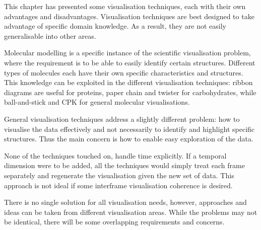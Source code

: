 This chapter has presented some visualisation techniques, each with their own
advantages and disadvantages. Visualisation techniques are best designed to
take advantage of specific domain knowledge. As a result, they are not easily
generalisable into other areas.

Molecular modelling is a specific instance of the scientific visualisation
problem, where the requirement is to be able to easily identify certain
structures. Different types of molecules each have their own specific
characteristics and structures. This knowledge can be exploited in the
different visualisation techniques: ribbon diagrams are useful for proteins,
paper chain and twister for carbohydrates, while ball-and-stick and CPK for
general molecular visualisations.

General visualisation techniques address a slightly different problem: how to
visualise the data effectively and not necessarily to identify and highlight
specific structures. Thus the main concern is how to enable easy exploration of
the data.

None of the techniques touched on, handle time explicitly. If a temporal
dimension were to be added, all the techniques would simply treat each frame
separately and regenerate the visualisation given the new set of data. This
approach is not ideal if some interframe visualisation coherence is desired.

There is no single solution for all visualisation needs, however, approaches and
ideas can be taken from different visualisation areas. While the problems may
not be identical, there will be some overlapping requirements and concerns.



